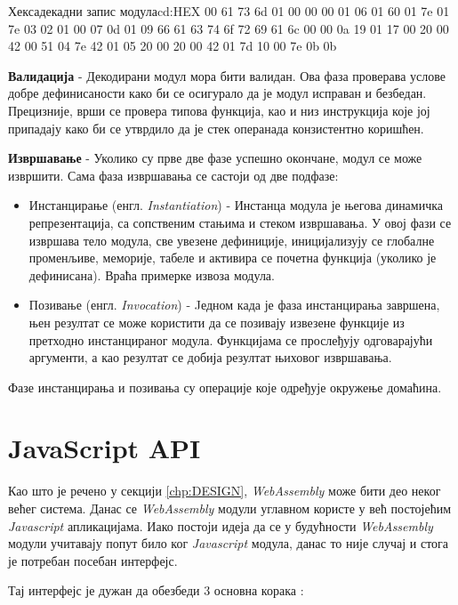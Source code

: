 \documentclass[12pt,oneside]{memoir}
\begin{document}
\begin{code}{Хексадекадни запис модула}{cd:HEX}
00 61 73 6d 01 00 00 00 01 06 01 60 01 7e 01 7e
03 02 01 00 07 0d 01 09 66 61 63 74 6f 72 69 61
6c 00 00 0a 19 01 17 00 20 00 42 00 51 04 7e 42
01 05 20 00 20 00 42 01 7d 10 00 7e 0b 0b 
\end{code}

\textbf{Валидација} - Декодирани модул мора бити валидан. Ова фаза проверава услове добре дефинисаности како би се
осигурало да је модул исправан и безбедан. Прецизније, врши се провера типова функција, као и низ инструкција које
јој припадају како би се утврдило да је стек операнада конзистентно коришћен.

\textbf{Извршавање} - Уколико су прве две фазе успешно окончане, модул се може извршити. Сама фаза извршавања се
састоји од две подфазе:

\begin{itemize}
	\item Инстанцирање (енгл. \textit{Instantiation}) - Инстанца модула је његова динамичка репрезентација, са
	сопственим стањима и стеком извршавања. У овој	фази се извршава тело модула, све увезене дефиниције,
	иницијализују се глобалне променљиве, меморије, табеле и активира се почетна функција (уколико је дефинисана).
	Враћа примерке извоза модула.
	\item Позивање (енгл. \textit{Invocation}) - Jедном када је фаза инстанцирања завршена, њен резултат се може
	користити да се позивају извезене функције из претходно инстанцираног модула. Функцијама се прослеђују
	одговарајући аргументи, а као резултат се добија резултат њиховог извршавања.
\end{itemize}
Фазе инстанцирања и позивања су операције које одређује окружење домаћина.

\section{JavaScript API} \label{chp:JSA}

Као што је речено у секцији \ref{chp:DESIGN}, \textit{WebAssembly} може бити део неког већег система. Данас се
\textit{WebAssembly} модули углавном користе у већ постојећим \textit{Javascript} апликацијама.
Иако постоји идеја да се у будућности \textit{WebAssembly} модули учитавају попут било ког \textit{Javascript}
модула, данас то није случај и стога је потребан посебан интерфејс.

Тај интерфејс је дужан да обезбеди 3 основна корака \cite{WASMJS}:
\end{document}
